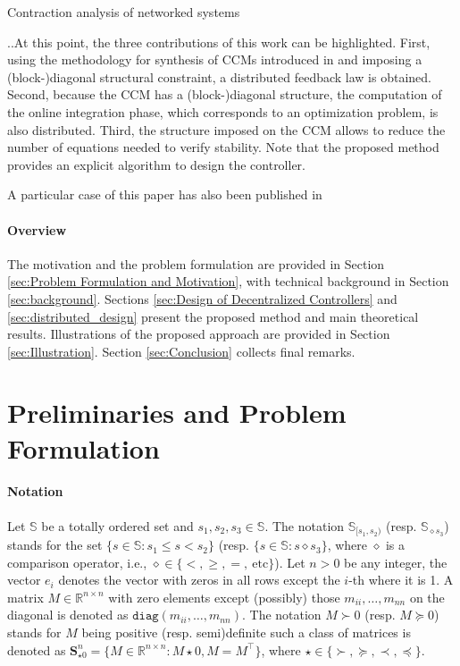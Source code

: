 \documentclass[10pt,twocolumn,twoside]{IEEEtran}
\newcounter{para}
\newcommand\mypara{\par \thesection.\refstepcounter{para}\thepara.\space}
\theoremstyle{plain}
\theoremstyle{definition}
\theoremstyle{remark}
\begin{document}
Contraction analysis of networked systems
\cite{Russo2013}
\cite{Aminzare2014a} 
\cite{manchester_existence_2018}


\mypara At this point, the three contributions of this work can be highlighted. First, using the methodology for synthesis of CCMs introduced in \cite{manchester_control_2017} and imposing a (block-)diagonal structural constraint, a distributed feedback law is obtained. Second, because the CCM has a (block-)diagonal structure, the computation of the online integration phase, which corresponds to an optimization problem, is also distributed. Third, the structure imposed on the CCM allows to reduce the number of equations needed to  verify stability. Note that the proposed method provides an explicit algorithm to design the controller.

A particular case of this paper has also been published in \cite{SteinShiromotoManchester2016}

\paragraph{Overview} The motivation and the problem formulation are provided in Section \ref{sec:Problem Formulation and Motivation}, with technical background in Section \ref{sec:background}. Sections \ref{sec:Design of Decentralized Controllers} and \ref{sec:distributed_design} present the proposed method and main theoretical results. Illustrations of the proposed approach are provided in Section \ref{sec:Illustration}. Section \ref{sec:Conclusion} collects final remarks.

\section{Preliminaries and Problem Formulation}

\paragraph{Notation} Let $\mathbb{S}$ be a totally ordered set and $s_1,s_2,s_3\in\mathbb{S}$. The notation $\mathbb{S}_{[s_1,s_2)}$ (resp. $\mathbb{S}_{\diamond s_3}$) stands for the set $\{s\in\mathbb{S}:s_1\leq s< s_2\}$ (resp. $\{s\in\mathbb{S}:s\diamond s_3\}$, where $\diamond$ is a comparison operator, i.e., $\diamond\in\{<,\geq,=,\ \text{etc}\}$). Let $n>0$ be any integer, the vector $e_i$ denotes the vector with zeros in all rows except the $i$-th where it is 1. A matrix $M\in\mathbb{R}^{n\times n}$ with zero elements except (possibly) those  $m_{ii},\ldots,m_{nn}$ on the diagonal is denoted as $\mathbin{\mathtt{diag}}(m_{ii},\ldots,m_{nn})$. The notation $M\succ 0$ (resp. $M\succeq 0$) stands for $M$ being positive (resp. semi)definite such a class of matrices is denoted as $\mathbf{S}_{\star0}^n=\{M\in\mathbb{R}^{n\times n}:M\star0,M=M^\top\}$, where $\star\in\{\succ,\succeq,\prec,\preceq\}$. 
\end{document}
